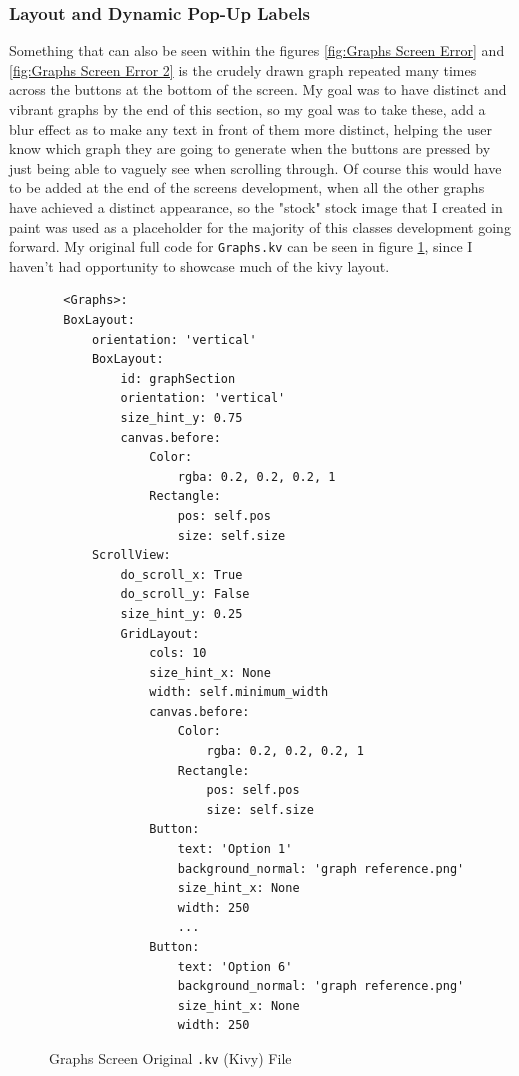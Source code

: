 \documentclass{article}
\begin{document}
\subsubsection{Layout and Dynamic Pop-Up Labels}
Something that can also be seen within the figures \ref{fig:Graphs Screen Error} and \ref{fig:Graphs Screen Error 2} is the crudely drawn graph repeated many times across the buttons at the bottom of the screen. My goal was to have distinct and vibrant graphs by the end of this section, so my goal was to take these, add a blur effect as to make any text in front of them more distinct, helping the user know which graph they are going to generate when the buttons are pressed by just being able to vaguely see when scrolling through. Of course this would have to be added at the end of the screens development, when all the other graphs have achieved a distinct appearance, so the "stock" stock image that I created in paint was used as a placeholder for the majority of this classes development going forward. My original full code for \texttt{Graphs.kv} can be seen in figure \ref{fig:Graphs Screen .kv}, since I haven't had opportunity to showcase much of the kivy layout.\\\vspace{0.3cm}

\begin{figure}
\begin{verbatim}
  <Graphs>:
  BoxLayout:
      orientation: 'vertical'
      BoxLayout:
          id: graphSection
          orientation: 'vertical'
          size_hint_y: 0.75
          canvas.before:
              Color:
                  rgba: 0.2, 0.2, 0.2, 1
              Rectangle:
                  pos: self.pos
                  size: self.size
      ScrollView:
          do_scroll_x: True
          do_scroll_y: False
          size_hint_y: 0.25
          GridLayout:
              cols: 10
              size_hint_x: None
              width: self.minimum_width
              canvas.before:
                  Color:
                      rgba: 0.2, 0.2, 0.2, 1
                  Rectangle:
                      pos: self.pos
                      size: self.size
              Button:
                  text: 'Option 1'
                  background_normal: 'graph reference.png'
                  size_hint_x: None
                  width: 250 
                  ...
              Button:
                  text: 'Option 6'
                  background_normal: 'graph reference.png'
                  size_hint_x: None
                  width: 250
\end{verbatim}
\caption{Graphs Screen Original \texttt{.kv} (Kivy) File}\label{fig:Graphs Screen .kv}
\end{figure}
\end{document}
